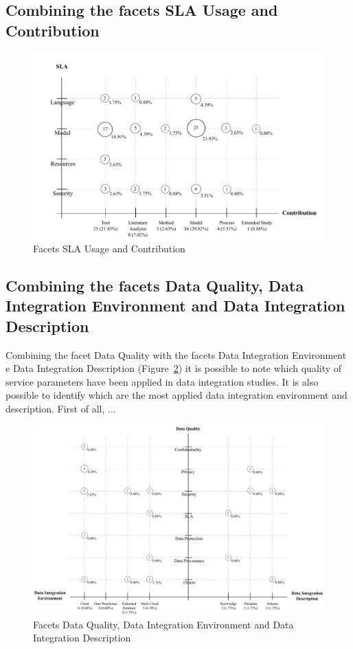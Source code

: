 \subsection{Combining the facets SLA Usage and Contribution}

\begin{figure}[h!]
\centering
\includegraphics[scale=0.5]{figs/bubble-charts/SLA-Contribution.pdf}
\caption{Facets SLA Usage and Contribution}\label{fig:facet3}
\end{figure}


\subsection{Combining the facets Data Quality, Data Integration Environment and Data Integration Description}

Combining the facet Data Quality with the facets Data Integration Environment e Data Integration Description
(Figure~\ref{fig:facet4}) it is possible to note which quality of service parameters have been applied in
data integration studies.
It is also possible to identify which are the most applied data integration environment and description.
First of all, ...

\begin{figure}[h!]
\centering
\includegraphics[scale=0.53]{figs/bubble-charts/Data-Quality-DI.pdf}
\caption{Facets Data Quality, Data Integration Environment and Data Integration Description}\label{fig:facet4}
\end{figure}

